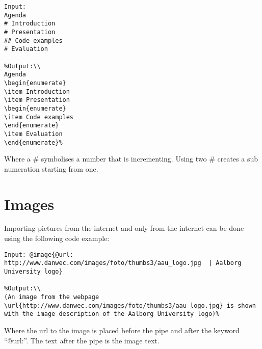 \begin{lstlisting}[frame=single]
Input:
Agenda
# Introduction
# Presentation
## Code examples
# Evaluation

%Output:\\
Agenda
\begin{enumerate}
\item Introduction
\item Presentation
\begin{enumerate}
\item Code examples
\end{enumerate}
\item Evaluation
\end{enumerate}%
\end{lstlisting}

Where a \# symbolises a number that is incrementing. Using two \# creates a sub numeration starting from one.

\section{Images}
Importing pictures from the internet and only from the internet can be done using the following code example:

\begin{lstlisting}[frame=single]
Input: @image{@url: http://www.danwec.com/images/foto/thumbs3/aau_logo.jpg  | Aalborg University logo}

%Output:\\
(An image from the webpage \url{http://www.danwec.com/images/foto/thumbs3/aau_logo.jpg} is shown with the image description of the Aalborg University logo)%
\end{lstlisting}

Where the url to the image is placed before the pipe and after the keyword ``@url:''. The text after the pipe is the image text.
